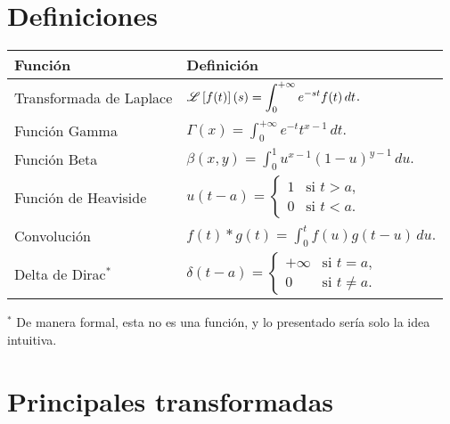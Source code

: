 \documentclass[a4,10pt,comentarios]{aleph-notas}
\newcommand{\lap}[2][s]{\displaystyle \mathscr{L} \left[#2\right](#1)}
\begin{document}
\encabezado

\section{Definiciones}

\begin{center}
    \begin{tabular}{ll}
    \toprule
        \textbf{Función} & \textbf{Definición} \\
    \midrule
        Transformada de Laplace & 
            $\displaystyle \lap{f(t)} = \int_0^{+\infty} e^{-st} f(t) \, dt$.
        \\[6mm]
        Función Gamma & 
            $\displaystyle \Gamma(x) = \int_0^{+\infty} e^{-t} t^{x-1} \, dt$. 
        \\[6mm]
        Función Beta & 
            $\displaystyle \beta(x, y) = \int_0^{1} u^{x-1} (1-u)^{y-1} \, du$. 
        \\[6mm]
        Función de Heaviside & 
            $\displaystyle u(t-a) = 
            \begin{cases}
            1 & \text{si } t > a, \\
            0 & \text{si } t < a.
            \end{cases}$ 
        \\[6mm]
        Convolución & 
            $\displaystyle f(t) \ast g(t) = \int_0^{t} f(u) g(t-u) \, du$. 
        \\[6mm]
        Delta de Dirac$^*$& 
            $\displaystyle \delta(t-a) = 
            \begin{cases}
            +\infty & \text{si } t = a, \\
            0 & \text{si } t \ne a.
            \end{cases}$ 
        \\
    \bottomrule
    \end{tabular}

\vspace{3mm}
{\footnotesize $^*$ De manera formal, esta no es una función, y lo presentado sería solo la idea intuitiva.}
\end{center}


\section{Principales transformadas}
\end{document}
